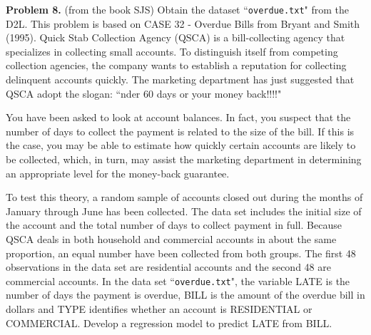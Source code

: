 \documentclass[12pt]{report}
\begin{document}
\noindent 
{\bf Problem 8.} (from the book SJS) Obtain the dataset ``{\tt overdue.txt}" from the D2L. This problem is based on CASE 32 - Overdue Bills from Bryant and Smith (1995). Quick Stab Collection Agency (QSCA) is a bill-collecting agency that specializes in collecting small accounts. To distinguish itself from competing collection agencies, the company wants to establish a reputation for collecting delinquent accounts quickly. The marketing department has just suggested that QSCA adopt the slogan: ``nder 60 days or your money back!!!!"

You have been asked to look at account balances. In fact, you suspect that the number of days to collect the payment is related to the size of the bill. If this is the case, you may be able to estimate how quickly certain accounts are likely to be collected, which, in turn, may assist the marketing department in determining an appropriate level for the money-back guarantee.

To test this theory, a random sample of accounts closed out during the months of January through June has been collected. The data set includes the initial size of the account and the total number of days to collect payment in full. Because QSCA deals in both household and commercial accounts in about the same proportion, an equal number have been collected from both groups. The first 48 observations in the data set are residential accounts and the second 48 are commercial accounts. In the data set ``{\tt overdue.txt}", the variable LATE is the number of days the payment is overdue, BILL is the amount of the overdue bill in dollars and TYPE identifies whether an account is RESIDENTIAL or COMMERCIAL.
Develop a regression model to predict LATE from BILL.
\end{document}
